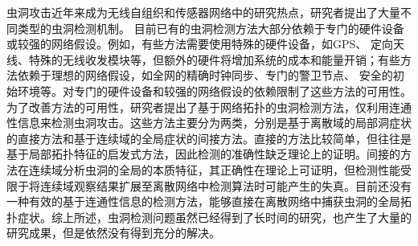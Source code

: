 虫洞攻击近年来成为无线自组织和传感器网络中的研究热点，研究者提出了大量不同类型的虫洞检测机制。
目前已有的虫洞检测方法大部分依赖于专门的硬件设备或较强的网络假设。例如，有些方法需要使用特殊的硬件设备，如GPS、 定向天线、特殊的无线收发模块等，但额外的硬件将增加系统的成本和能量开销；有些方法依赖于理想的网络假设，如全网的精确时钟同步、专门的警卫节点、 安全的初始环境等。对专门的硬件设备和较强的网络假设的依赖限制了这些方法的可用性。为了改善方法的可用性，研究者提出了基于网络拓扑的虫洞检测方法，仅利用连通性信息来检测虫洞攻击。这些方法主要分为两类，分别是基于离散域的局部洞症状的直接方法和基于连续域的全局症状的间接方法。直接的方法比较简单，但往往是基于局部拓扑特征的启发式方法，因此检测的准确性缺乏理论上的证明。间接的方法在连续域分析虫洞的全局的本质特征，其正确性在理论上可证明，但检测性能受限于将连续域观察结果扩展至离散网络中检测算法时可能产生的失真。目前还没有一种有效的基于连通性信息的检测方法，能够直接在离散网络中捕获虫洞的全局拓扑症状。综上所述，虫洞检测问题虽然已经得到了长时间的研究，也产生了大量的研究成果，但是依然没有得到充分的解决。

